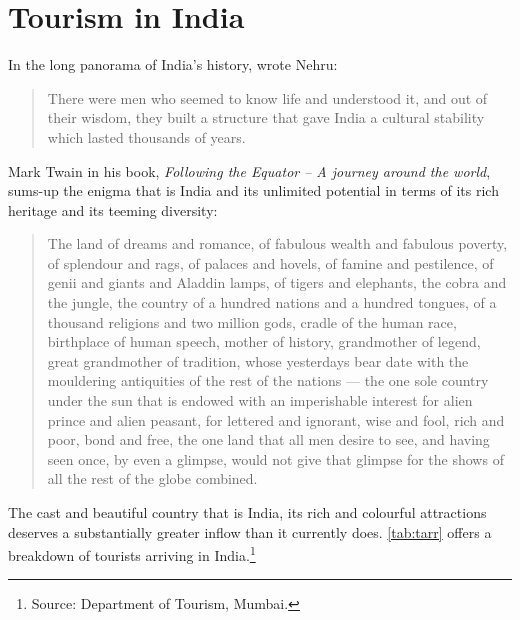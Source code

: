 \chapter{Tourism in India} %
\label{cha:tii}

In the long panorama of India's history, wrote Nehru:

\begin{quote}
  There were men who seemed to know life and understood it, and out of their wisdom, they built a structure that gave India a cultural stability which lasted thousands of years.
\end{quote}

\noindent Mark Twain in his book, \emph{Following the Equator -- A journey around the world}, sums-up the enigma that is India and its unlimited potential in terms of its rich heritage and its teeming diversity: 

\begin{quote}
  The land of dreams and romance, of fabulous wealth and fabulous poverty, of splendour and rags, of palaces and hovels, of famine and pestilence, of genii and giants and Aladdin lamps, of tigers and elephants, the cobra and the jungle, the country of a hundred nations and a hundred tongues, of a thousand religions and two million gods, cradle of the human race, birthplace of human speech, mother of history, grandmother of legend, great grandmother of tradition, whose yesterdays bear date with the mouldering antiquities of the rest of the nations --- the one sole country under the sun that is endowed with an imperishable interest for alien prince and alien peasant, for lettered and ignorant, wise and fool, rich and poor, bond and free, the one land that all men desire to see, and having seen once, by even a glimpse, would not give that glimpse for the shows of all the rest of the globe combined.
\end{quote}

\noindent The cast and beautiful country that is India, its rich and colourful attractions deserves a substantially greater inflow than it currently does. \autoref{tab:tarr} offers a breakdown of tourists arriving in India.\footnote{Source: Department of Tourism, Mumbai.}

